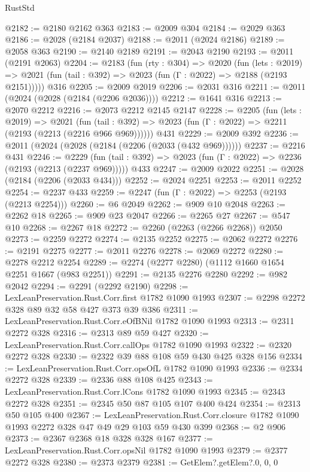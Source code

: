 \begin{lexlean}{RustStd}
\begin{coremodule}
@2182 := @2180 @2162 @363
@2183 := @2009 @304
@2184 := @2029 @363
@2186 := @2028 (@2184 @2037)
@2188 := @2011 (@2024 @2186)
@2189 := @2058 @363
@2190 := @2140 @2189
@2191 := @2043 @2190
@2193 := @2011 (@2191 @2063)
@2204 := @2183
    (fun (rty : @304) =>
    @2020
      (fun (lets : @2019) =>
      @2021 (fun (tail : @392) => @2023 (fun (Γ : @2022) => @2188 (@2193 @2151)))))
    @316
@2205 := @2009 @2019
@2206 := @2031 @316
@2211 := @2011 (@2024 (@2028 (@2184 (@2206 @2036))))
@2212 := @1641 @316
@2213 := @2070 @2212
@2216 := @2073 @2212 @2145 @2147
@2228 := @2205
    (fun (lets : @2019) =>
    @2021 (fun (tail : @392) => @2023 (fun (Γ : @2022) => @2211 (@2193 (@2213 (@2216 @966 @969))))))
    @431
@2229 := @2009 @392
@2236 := @2011 (@2024 (@2028 (@2184 (@2206 (@2033 (@432 @969))))))
@2237 := @2216 @431
@2246 := @2229
    (fun (tail : @392) => @2023 (fun (Γ : @2022) => @2236 (@2193 (@2213 (@2237 @969)))))
    @433
@2247 := @2009 @2022
@2251 := @2028 (@2184 (@2206 (@2033 @434)))
@2252 := @2024 @2251
@2253 := @2011 @2252
@2254 := @2237 @433
@2259 := @2247 (fun (Γ : @2022) => @2253 (@2193 (@2213 @2254)))
@2260 := @6 @2049
@2262 := @909 @10 @2048
@2263 := @2262 @18
@2265 := @909 @23 @2047
@2266 := @2265 @27
@2267 := @547 @10
@2268 := @2267 @18
@2272 := @2260 (@2263 (@2266 @2268)) @2050
@2273 := @2259 @2272
@2274 := @2135 @2252
@2275 := @2062 @2272
@2276 := @2191 @2275
@2277 := @2011 @2276
@2278 := @2069 @2272
@2280 := @2278 @2212 @2254
@2289 := @2274 (@2277 @2280) (@1112 @1660 @1654 @2251 @1667 (@983 @2251))
@2291 := @2135 @2276 @2280
@2292 := @982 @2042
@2294 := @2291 (@2292 @2190)
@2298 := LexLeanPreservation.Rust.Corr.first @1782 @1090 @1993
@2307 := @2298 @2272 @328 @89 @32 @58 @427 @373 @39 @386
@2311 := LexLeanPreservation.Rust.Corr.eOfBNil @1782 @1090 @1993
@2313 := @2311 @2272 @328
@2316 := @2313 @89 @59 @427
@2320 := LexLeanPreservation.Rust.Corr.callOps @1782 @1090 @1993
@2322 := @2320 @2272 @328
@2330 := @2322 @39 @88 @108 @59 @430 @425 @328 @156
@2334 := LexLeanPreservation.Rust.Corr.opsOfL @1782 @1090 @1993
@2336 := @2334 @2272 @328
@2339 := @2336 @88 @108 @425
@2343 := LexLeanPreservation.Rust.Corr.lCons @1782 @1090 @1993
@2345 := @2343 @2272 @328
@2351 := @2345 @50 @87 @105 @107 @400 @424
@2354 := @2313 @50 @105 @400
@2367 := LexLeanPreservation.Rust.Corr.closure
    @1782
    @1090
    @1993
    @2272
    @328
    @47
    @49
    @29
    @103
    @59
    @430
    @399
@2368 := @2 @906
@2373 := @2367 @2368 @18 @328 @328 @167
@2377 := LexLeanPreservation.Rust.Corr.opsNil @1782 @1090 @1993
@2379 := @2377 @2272 @328
@2380 := @2373 @2379
@2381 := GetElem?.getElem?.{0, 0, 0}

\end{coremodule}
\end{lexlean}

